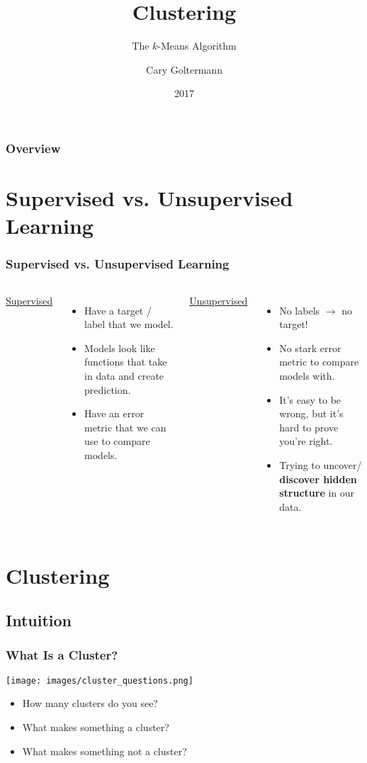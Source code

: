 \documentclass{beamer}
\title{Clustering}
\subtitle{The $k$-Means Algorithm}
\author{Cary Goltermann}
\institute{Galvanize}
\date{2017}
\begin{document}
 
\frame{\titlepage}
 
\begin{frame}
  \frametitle{Overview}
  \tableofcontents[]
\end{frame}

\section{Supervised vs. Unsupervised Learning}
\begin{frame}
  \frametitle{Supervised vs. Unsupervised Learning}
  \begin{columns}[T]
    \qquad \underline{\LARGE Supervised} \vspace{3mm}
    \begin{itemize}
      \item Have a target / label that we model.
      \item Models look like functions that take in data and create prediction.
      \item Have an error metric that we can use to compare models.
    \end{itemize} \pause

    \qquad \underline{\LARGE Unsupervised} \vspace{3mm}
    \begin{itemize}
      \item No labels $\rightarrow$ no target!
      \item No stark error metric to compare models with.
      \item It's easy to be wrong, but it's hard to prove you're right.
      \item Trying to uncover/ \textbf{discover hidden structure} in our data.
    \end{itemize}
  \end{columns}
\end{frame}

\section{Clustering}
\subsection{Intuition}
\begin{frame}
  \frametitle{What Is a Cluster?}
  \centering
  \texttt{[image: images/cluster\_questions.png]}
  \vspace{-4mm}
  \begin{itemize}
    \item How many clusters do you see?
    \item What makes something a cluster?
    \item What makes something not a cluster?
  \end{itemize}
\end{frame}
\end{document}
